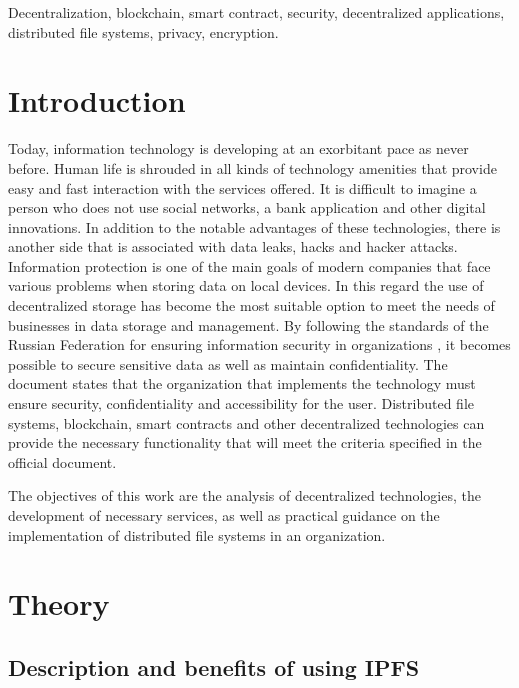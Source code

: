 \documentclass[10pt,conference,a4paper]{IEEEtran_EDM}
\begin{document}
\begin{IEEEkeywords}
Decentralization, blockchain, smart contract, security, decentralized applications, distributed file systems, privacy, encryption.
\end{IEEEkeywords}

\section{Introduction}
Today, information technology is developing at an exorbitant pace as never before.
Human life is shrouded in all kinds of technology amenities that provide easy and fast interaction with the services offered.
It is difficult to imagine a person who does not use social networks, a bank application and other digital innovations.
In addition to the notable advantages of these technologies, there is another side that is associated with data leaks, hacks and hacker attacks.
Information protection is one of the main goals of modern companies that face various problems when storing data on local devices.
In this regard the use of decentralized storage has become the most suitable option to meet the needs of businesses in data storage and management.
By following the standards of the Russian Federation for ensuring information security in organizations \cite{GOST53114}, it becomes possible to secure sensitive data as well as maintain confidentiality.
The document states that the organization that implements the technology must ensure security, confidentiality and accessibility for the user.
Distributed file systems, blockchain, smart contracts and other decentralized technologies can provide the necessary functionality that will meet the criteria specified in the official document.

The objectives of this work are the analysis of decentralized technologies, the development of necessary services, as well as practical guidance on the implementation of distributed file systems in an organization.

\section{Theory}

\subsection{Description and benefits of using IPFS}
\end{document}
